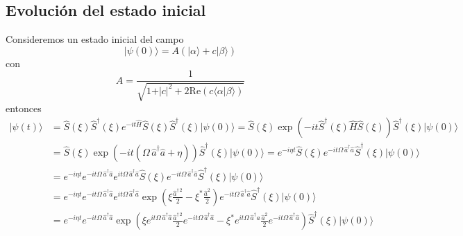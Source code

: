 \subsection{Evolución del estado inicial}
Consideremos un estado inicial del campo
\begin{equation*}
  \vert \psi(0)\rangle = A \left(\vert \alpha \rangle + c \vert  \beta\rangle \right)
\end{equation*}
con
\begin{equation*}
  A = \frac{1}{\sqrt{1+\vert c\vert^{2} + 2 \mathrm{Re}\left(c\langle \alpha \vert \beta \rangle \right)}}
\end{equation*}
entonces
\begin{align*}
  \vert \psi(t) \rangle & = \hat{S}(\xi)\hat{S}^{\dagger}(\xi) e^{-it \hat{H}} \hat{S}(\xi)\hat{S}^{\dagger}(\xi)\vert \psi(0)\rangle = \hat{S}(\xi)\exp\left(-it \hat{S}^{\dagger}(\xi)\hat{H}\hat{S}(\xi)\right) \hat{S}^{\dagger}(\xi)\vert \psi(0)\rangle                                                                                                                                                     \\
                        & = \hat{S}(\xi)\exp\left(-it \left(\Omega \,\hat{a}^{\dagger}\hat{a} + \eta\right)\right) \hat{S}^{\dagger}(\xi)\vert \psi(0)\rangle = e^{-i\eta t} \hat{S}(\xi)e^{-it \Omega \,\hat{a}^{\dagger}\hat{a}} \hat{S}^{\dagger}(\xi)\vert \psi(0)\rangle                                                                                                                                     \\
                        & = e^{-i\eta t}e^{-it \Omega \,\hat{a}^{\dagger}\hat{a}} e^{it \Omega \,\hat{a}^{\dagger}\hat{a}} \hat{S}(\xi) e^{-it \Omega \,\hat{a}^{\dagger}\hat{a}} \hat{S}^{\dagger}(\xi)\vert \psi(0)\rangle                                                                                                                                                                                      \\
                        & = e^{-i\eta t}e^{-it \Omega \,\hat{a}^{\dagger}\hat{a}} e^{it \Omega \,\hat{a}^{\dagger}\hat{a}} \exp\left(\xi \frac{\hat{a}^{\dagger\,2}}{2} - \xi^{*} \frac{\hat{a}^{2}}{2}\right) e^{-it \Omega \,\hat{a}^{\dagger}\hat{a}} \hat{S}^{\dagger}(\xi)\vert \psi(0)\rangle                                                                                                               \\
                        & = e^{-i\eta t} e^{-it \Omega \,\hat{a}^{\dagger}\hat{a}}  \exp\left(\xi e^{it \Omega \,\hat{a}^{\dagger}\hat{a}}\frac{\hat{a}^{\dagger\,2}}{2}e^{-it \Omega \,\hat{a}^{\dagger}\hat{a}} - \xi^{*} e^{it \Omega \,\hat{a}^{\dagger}\hat{a}} \frac{\hat{a}^{2}}{2} e^{-it \Omega \,\hat{a}^{\dagger}\hat{a}}\right)  \hat{S}^{\dagger}(\xi)\vert \psi(0)\rangle                           \\

\end{align*}
